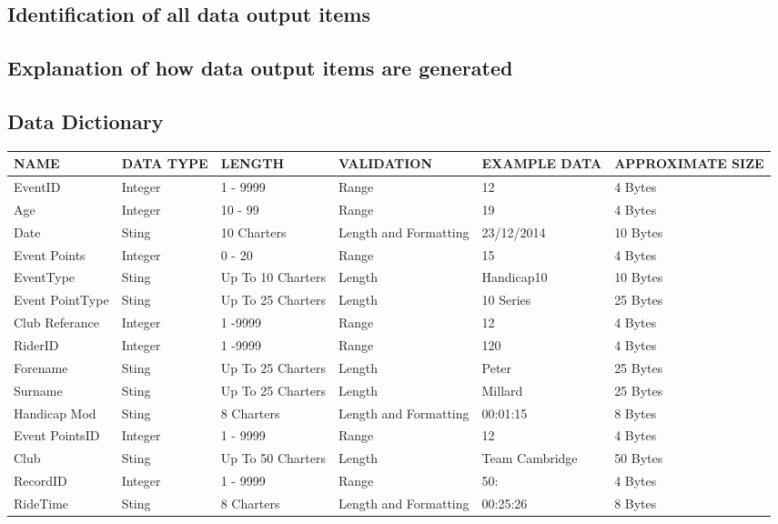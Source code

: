 \subsection{Identification of all data output items}

\subsection{Explanation of how data output items are generated}

\subsection{Data Dictionary}

\begin{tabular}{|p{1.5cm}|p{1.5cm}|p{1.8cm}|p{2.1cm}|l|p{2.5cm}|}
	\hline
	NAME & DATA TYPE & LENGTH & VALIDATION & EXAMPLE DATA & APPROXIMATE SIZE \\ \hline
	EventID & Integer & 1 - 9999 & Range & 12 & 4 Bytes \\ \hline
	Age & Integer & 10 - 99  & Range & 19 & 4 Bytes \\ \hline
	Date & Sting & 10 Charters & Length and Formatting & 23/12/2014 & 10 Bytes \\ \hline
	Event Points & Integer & 0 - 20 & Range & 15 & 4 Bytes \\ \hline
	EventType & Sting & Up To 10 Charters & Length & Handicap10 & 10 Bytes \\ \hline
	Event PointType & Sting & Up To 25 Charters & Length & 10 Series & 25 Bytes \\ \hline
	Club Referance & Integer & 1 -9999 & Range & 12 & 4 Bytes \\ \hline
	RiderID & Integer & 1 -9999 & Range & 120 & 4 Bytes \\ \hline
	Forename & Sting & Up To 25 Charters & Length & Peter & 25 Bytes \\ \hline
	Surname & Sting & Up To 25 Charters & Length & Millard & 25 Bytes \\ \hline
	Handicap Mod & Sting & 8 Charters & Length and Formatting & 00:01:15 & 8 Bytes \\ \hline
	Event PointsID & Integer & 1 - 9999 & Range & 12 & 4 Bytes \\ \hline
	Club & Sting & Up To 50 Charters & Length & Team Cambridge & 50 Bytes \\ \hline
	RecordID & Integer & 1 - 9999 & Range & 50: & 4 Bytes \\ \hline
	RideTime & Sting & 8 Charters & Length and Formatting & 00:25:26 & 8 Bytes \\ \hline

\end{tabular}
